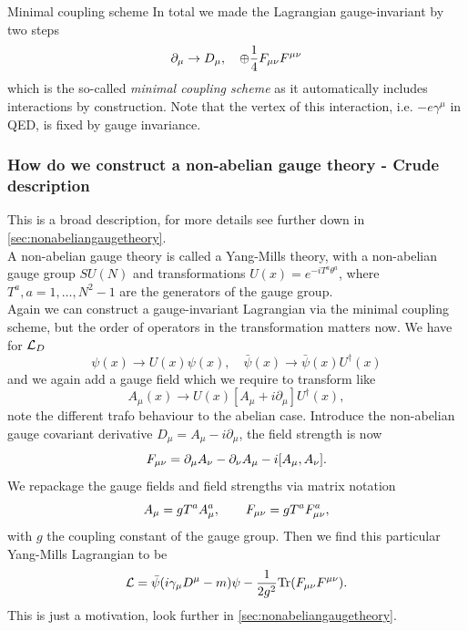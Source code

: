 \begin{mybox}{Minimal coupling scheme}
	In total we made the Lagrangian gauge-invariant by two steps
	\begin{equation}
		\partial_\mu \rightarrow D_\mu,\quad \oplus \frac{1}{4} F_{\mu \nu} F^{\mu \nu}
	\end{equation}
	which is the so-called \emph{minimal coupling scheme} as it automatically includes interactions by construction. Note that the vertex of this interaction, i.e. $-e \gamma^\mu$ in QED, is fixed by gauge invariance.
\end{mybox}
\subsubsection{How do we construct a non-abelian gauge theory - Crude description}
This is a broad description, for more details see further down in \ref{sec:nonabeliangaugetheory}. \\
A non-abelian gauge theory is called a Yang-Mills theory, with a non-abelian gauge group $SU(N)$ and transformations $U(x) = e^{-i T^a \theta^a}$, where $T^a,a=1,\dots,N^2-1$ are the generators of the gauge group.\\
Again we can construct a gauge-invariant Lagrangian via the minimal coupling scheme, but the order of operators in the transformation matters now. We have for $\mathcal{L}_D$
\begin{equation}
	\psi(x) \rightarrow U(x) \psi(x),\quad \bar{ \psi}(x) \rightarrow \bar{ \psi}(x) U^\dagger(x)
\end{equation}
and we again add a gauge field which we require to transform like
\begin{equation}
	A_\mu(x) \rightarrow U(x) \left[ A_\mu + i \partial_\mu\right]U^\dagger(x),
\end{equation}
note the different trafo behaviour to the abelian case. Introduce the non-abelian gauge covariant derivative $D_\mu = A_\mu - i \partial_\mu$, the field strength is now
\begin{equation*}
	F_{\mu \nu} = \partial_\mu A_\nu-\partial_\nu A_\mu - i [A_\mu,A_\nu].
\end{equation*}
We repackage the gauge fields and field strengths via matrix notation
\begin{equation*}
	A_\mu = g T^a A^a_\mu, \qquad F_{\mu \nu}= g T^a F^a_{\mu \nu},
\end{equation*}
with $g$ the coupling constant of the gauge group. Then we find this particular Yang-Mills Lagrangian to be
\begin{equation}
	\mathcal{L} = \bar{ \psi} (i\gamma_\mu D^\mu -m) \psi - \frac{1}{2 g^2} \mathrm{Tr} (F_{\mu \nu} F^{\mu \nu}).
\end{equation}
This is just a motivation, look further in \ref{sec:nonabeliangaugetheory}.

